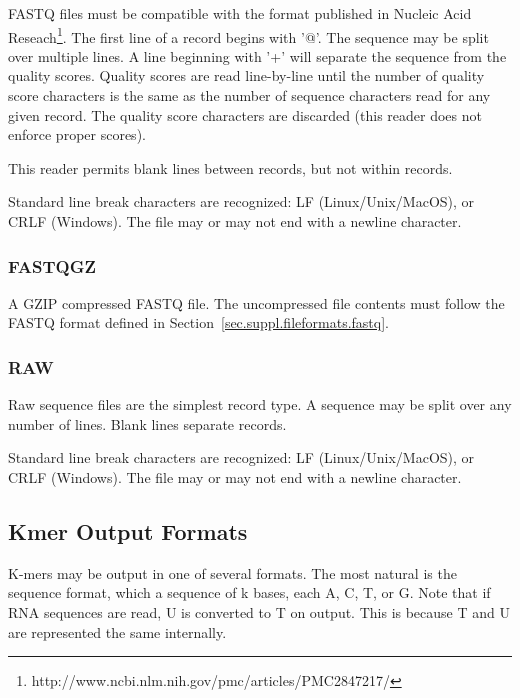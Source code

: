 FASTQ files must be compatible with the format published in Nucleic Acid Reseach\footnote{http://www.ncbi.nlm.nih.gov/pmc/articles/PMC2847217/}. The first line of a record begins with '@'. The sequence may be split over multiple lines. A line beginning with '+' will separate the sequence from the quality scores. Quality scores are read line-by-line until the number of quality score characters is the same as the number of sequence characters read for any given record. The quality score characters are discarded (this reader does not enforce proper scores).

This reader permits blank lines between records, but not within records.

Standard line break characters are recognized: LF (Linux/Unix/MacOS), or CRLF (Windows). The file may or may not end with a newline character.

\subsubsection{FASTQGZ}
\label{sec.supl.fileformats.fastqgz}

A GZIP compressed FASTQ file. The uncompressed file contents must follow the FASTQ format defined in Section~\ref{sec.suppl.fileformats.fastq}.

\subsubsection{RAW}
\label{sec.suppl.fileformats.raw}

Raw sequence files are the simplest record type. A sequence may be split over any number of lines. Blank lines separate records.

Standard line break characters are recognized: LF (Linux/Unix/MacOS), or CRLF (Windows). The file may or may not end with a newline character.


\subsection{Kmer Output Formats}
\label{sec.suppl.outputformat}

K-mers may be output in one of several formats. The most natural is the sequence format, which a sequence of k bases, each A, C, T, or G. Note that if RNA sequences are read, U is converted to T on output. This is because T and U are represented the same internally.

